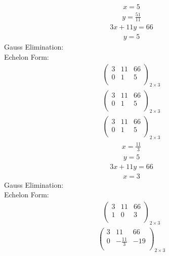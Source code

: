 \documentclass{article}
\begin{document}
\begin{align*}
x=5\end{align*}
\begin{align*}
y=\frac{51}{11}\end{align*}
\begin{align*}
3x + 11y=66\end{align*}
\begin{align*}
y=5\end{align*}
Gauss Elimination:\\
Echelon Form:\\
\begin{align*}
\left(
\begin{array}{cc|c}
3 & 11 & 66\\
0 & 1 & 5\\
\end{array}
\right)_{2\times 3}
\end{align*}
\begin{align*}
\left(
\begin{array}{cc|c}
3 & 11 & 66\\
0 & 1 & 5\\
\end{array}
\right)_{2\times 3}
\end{align*}
\begin{align*}
\left(
\begin{array}{cc|c}
3 & 11 & 66\\
0 & 1 & 5\\
\end{array}
\right)_{2\times 3}
\end{align*}
\begin{align*}
x=\frac{11}{3}\end{align*}
\begin{align*}
y=5\end{align*}
\begin{align*}
3x + 11y=66\end{align*}
\begin{align*}
x=3\end{align*}
Gauss Elimination:\\
Echelon Form:\\
\begin{align*}
\left(
\begin{array}{cc|c}
3 & 11 & 66\\
1 & 0 & 3\\
\end{array}
\right)_{2\times 3}
\end{align*}
\begin{align*}
\left(
\begin{array}{cc|c}
3 & 11 & 66\\
0 & -\frac{11}{3} & -19\\
\end{array}
\right)_{2\times 3}
\end{align*}
\end{document}

